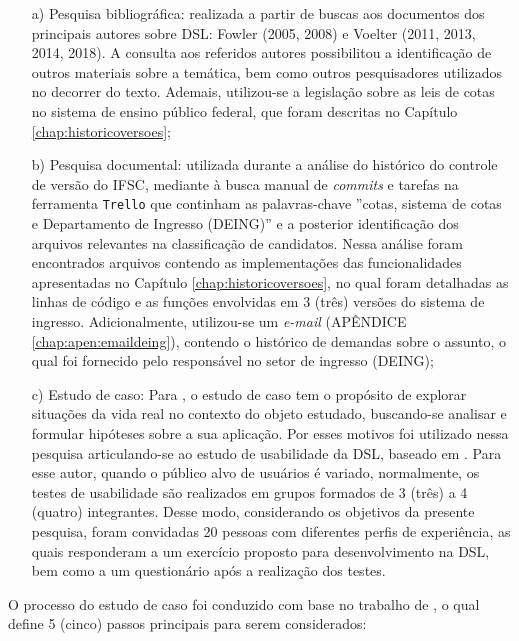 \begin{enumerate}
    \item[a)] Pesquisa bibliográfica: realizada a partir de buscas aos documentos dos principais autores sobre \gls{DSL}: Fowler (2005, 2008) e Voelter (2011, 2013, 2014, 2018). A consulta aos referidos autores possibilitou a identificação de outros materiais sobre a temática, bem como outros pesquisadores utilizados no decorrer do texto. Ademais, utilizou-se a legislação sobre as leis de cotas no sistema de ensino público federal, que foram descritas no Capítulo \ref{chap:historicoversoes};

    
    \item[b)] Pesquisa documental: utilizada durante a análise do histórico do controle de versão do \gls{IFSC}, mediante à busca manual de \textit{commits} e tarefas na ferramenta \texttt{Trello} que continham as palavras-chave ''cotas, sistema de cotas e Departamento de Ingresso (DEING)'' e a posterior identificação dos arquivos relevantes na classificação de candidatos. Nessa análise foram encontrados arquivos contendo as implementações das funcionalidades apresentadas no Capítulo \ref{chap:historicoversoes}, no qual foram detalhadas as linhas de código e as funções envolvidas em 3 (três) versões do sistema de ingresso. Adicionalmente, utilizou-se um \textit{e-mail} (APÊNDICE \ref{chap:apen:emaildeing}), contendo o histórico de demandas sobre o assunto, o qual foi fornecido pelo responsável no setor de ingresso (DEING);
    
    \item[c)] Estudo de caso: Para , o estudo de caso tem o propósito de explorar situações da vida real no contexto do objeto estudado, buscando-se analisar e formular hipóteses sobre a sua aplicação. Por esses motivos foi utilizado nessa pesquisa articulando-se ao estudo de usabilidade da \gls{DSL}, baseado em . Para esse autor, quando o público alvo de usuários é variado, normalmente, os testes de usabilidade são realizados em grupos formados de 3 (três) a 4 (quatro) integrantes. Desse modo, considerando os objetivos da presente pesquisa, foram convidadas 20 pessoas com diferentes perfis de experiência, as quais responderam a um exercício proposto para desenvolvimento na \gls{DSL}, bem como a um questionário após a realização dos testes. 
    
\end{enumerate}

    O processo do estudo de caso foi conduzido com base no trabalho de , o qual define 5 (cinco) passos principais para serem considerados:
    
